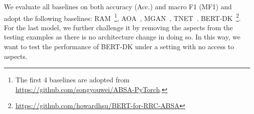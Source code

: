 We evaluate all baselines on both accuracy (Acc.) and macro F1 (MF1) and adopt the following baselines:
RAM~\cite{chen2017recurrent}\footnote{The first 4 baselines are adopted from \url{https://github.com/songyouwei/ABSA-PyTorch}.},
AOA~\cite{huang2018aspect},
MGAN~\cite{li2018exploiting},
TNET~\cite{li2018transformation}. 
BERT-DK~\cite{xu_bert2019}\footnote{\url{https://github.com/howardhsu/BERT-for-RRC-ABSA}}. 
For the last model, we further challenge it by removing the aspects from the testing examples as there is no architecture change in doing so. 
In this way, we want to test the performance of BERT-DK under a setting with no access to aspects. 

